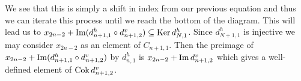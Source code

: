 We see that this is simply a shift in index from our previous equation and thus we can iterate this process until we reach the bottom of the diagram. This will lead us to $x_{2n-2} + \operatorname{Im} (d^h_{n+1, 1} \circ d^v_{n+1, 2}) \subseteq \operatorname{Ker} d^h_{N, 1}$. Since $d^h_{N+1, 1}$ is injective we may consider $x_{2n-2}$ as an element of $C_{n+1,1}$. Then the preimage of $x_{2n-2} + \operatorname{Im} (d^h_{n+1, 1} \circ d^v_{n+1, 2})$ by $d^h_{n, 1}$ is $x_{2n-2} + \operatorname{Im} d^v_{n+1, 2}$ which gives a well-defined element of $\operatorname{Cok} d^v_{n+1,2}$. 